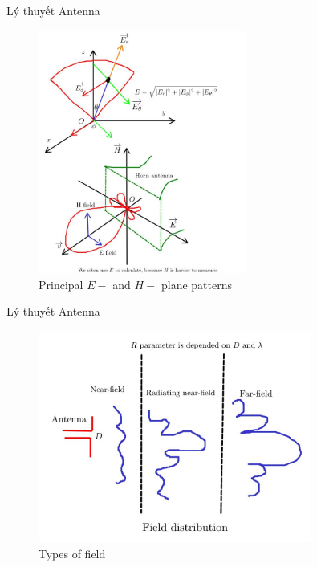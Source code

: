 \documentclass[8pt]{beamer}
\begin{document}
\begin{frame}{Lý thuyết Antenna}
\begin{figure}[h]
			\includegraphics[width=0.61\textwidth]{e.jpg}
			\caption{Principal $E-$ and $H-$ plane patterns}			\label{fig:re10}
\end{figure}

\end{frame}
\begin{frame}{Lý thuyết Antenna}

\begin{figure}[h]
			\includegraphics[width=0.8\textwidth]{field.jpg}
			\caption{Types of field}			\label{fig:re10}
\end{figure}
\end{frame}
\end{document}
